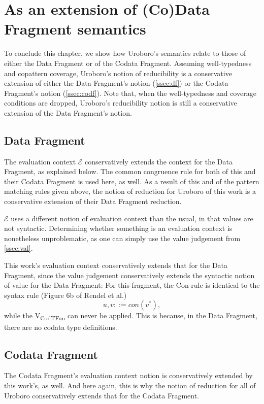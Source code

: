 \section{As an extension of (Co)Data Fragment semantics}
\label{sec:codfragext}

To conclude this chapter, we show how Uroboro's semantics relate to those of either the Data Fragment or of the Codata Fragment. Assuming well-typedness and copattern coverage, Uroboro's notion of reducibility is a conservative extension of either the Data Fragment's notion (\autoref{ssec:df}) or the Codata Fragment's notion (\autoref{ssec:codf}). Note that, when the well-typedness and coverage conditions are dropped, Uroboro's reducibility notion is still a conservative extension of the Data Fragment's notion.

\subsection{Data Fragment}
\label{ssec:df}

The evaluation context $\mathcal{E}$ conservatively extends the context for the Data Fragment, as explained below. The common congruence rule for both of this and their Codata Fragment is used here, as well. As a result of this and of the pattern matching rules given above, the notion of reduction for Uroboro of this work is a conservative extension of their Data Fragment reduction.

$\mathcal{E}$ uses a different notion of evaluation context than the usual, in that values are not syntactic. Determining whether something is an evaluation context is nonetheless unproblematic, as one can simply use the value judgement from \autoref{ssec:val}.

This work's evaluation context conservatively extends that for the Data Fragment, since the value judgement conservatively extends the syntactic notion of value for the Data Fragment: For this fragment, the Con rule is identical to the syntax rule (Figure 6b of Rendel et al.\cite{rendel15automatic})
\[
u, v ::= con(v^*),
\]
while the V\textsubscript{CodTFun} can never be applied. This is because, in the Data Fragment, there are no codata type definitions.

\subsection{Codata Fragment}
\label{ssec:codf}

The Codata Fragment's evaluation context notion is conservatively extended by this work's, as well. And here again, this is why the notion of reduction for all of Uroboro conservatively extends that for the Codata Fragment.

